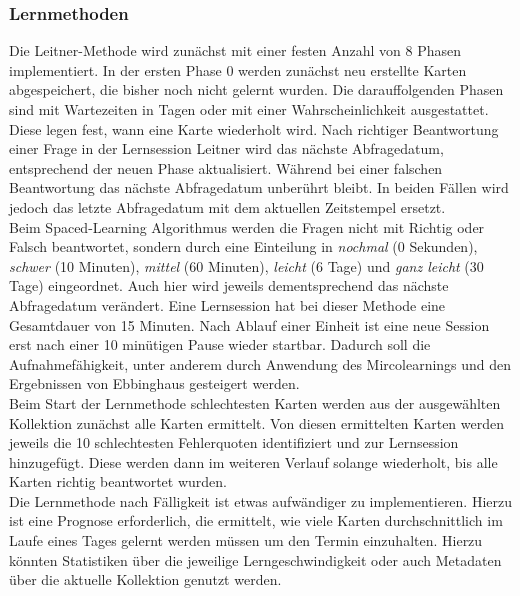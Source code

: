 \subsubsection{Lernmethoden}
Die Leitner-Methode wird zunächst mit einer festen Anzahl von 8 Phasen implementiert. In der ersten Phase 0 werden zunächst neu erstellte Karten abgespeichert, die bisher noch nicht gelernt wurden. Die darauffolgenden Phasen sind mit Wartezeiten in Tagen oder mit einer Wahrscheinlichkeit ausgestattet. Diese legen fest, wann eine Karte wiederholt wird. Nach richtiger Beantwortung einer Frage in der Lernsession \glqq Leitner\grqq{}
 wird das nächste Abfragedatum, entsprechend der neuen Phase aktualisiert. Während bei einer falschen Beantwortung das nächste Abfragedatum unberührt bleibt. In beiden Fällen wird jedoch das letzte Abfragedatum mit dem aktuellen Zeitstempel ersetzt. \\

\noindent Beim Spaced-Learning Algorithmus werden die Fragen nicht mit \glqq Richtig\grqq{} oder \glqq Falsch\grqq{} beantwortet, sondern durch eine Einteilung in \emph{nochmal} (0 Sekunden), \emph{schwer} (10 Minuten), \emph{mittel} (60 Minuten), \emph{leicht} (6 Tage) und \emph{ganz leicht} (30 Tage) eingeordnet. Auch hier wird jeweils dementsprechend das nächste Abfragedatum verändert. 
Eine Lernsession hat bei dieser Methode eine Gesamtdauer von 15 Minuten. Nach Ablauf einer Einheit ist eine neue Session erst nach einer 10 minütigen Pause wieder startbar. Dadurch soll die Aufnahmefähigkeit, unter anderem durch Anwendung des Mircolearnings und den Ergebnissen von Ebbinghaus gesteigert werden. \\

\noindent Beim Start der Lernmethode \glqq{}schlechtesten Karten\grqq{} werden aus der ausgewählten Kollektion zunächst alle Karten ermittelt. Von diesen ermittelten Karten werden jeweils die 10 schlechtesten Fehlerquoten identifiziert und zur Lernsession hinzugefügt. Diese werden dann im weiteren Verlauf solange wiederholt, bis alle Karten richtig beantwortet wurden. \\

\noindent Die Lernmethode \glqq{}nach Fälligkeit\grqq{} ist etwas aufwändiger zu implementieren. Hierzu ist eine Prognose erforderlich, die ermittelt, wie viele Karten durchschnittlich im Laufe eines Tages gelernt werden müssen um den Termin einzuhalten. Hierzu könnten Statistiken über die jeweilige Lerngeschwindigkeit oder auch Metadaten über die aktuelle Kollektion genutzt werden. \\

